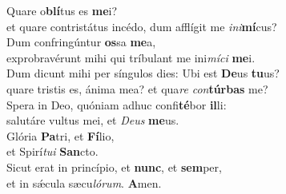 \oddverse Quare o\textbf{blí}tus es \textbf{me}i?~\*\\
\oddverse et quare contristátus incédo, dum afflígit me \textit{i}\textit{ni}\textbf{mí}cus?\\
\evenverse Dum confringúntur \textbf{os}sa \textbf{me}a,~\*\\
\evenverse exprobravérunt mihi qui tríbulant me ini\textit{mí}\textit{ci} \textbf{me}i.\\
\oddverse Dum dicunt mihi per síngulos dies: Ubi est \textbf{De}us \textbf{tu}us?~\*\\
\oddverse quare tristis es, ánima mea? et qua\textit{re} \textit{con}\textbf{túr}\textbf{bas} me?\\
\evenverse Spera in Deo, quóniam adhuc confi\textbf{té}bor \textbf{il}li:~\*\\
\evenverse salutáre vultus mei, et \textit{De}\textit{us} \textbf{me}us.\\
\oddverse Glória \textbf{Pa}tri, et \textbf{Fí}lio,~\*\\
\oddverse et Spirí\textit{tu}\textit{i} \textbf{San}cto.\\
\evenverse Sicut erat in princípio, et \textbf{nunc}, et \textbf{sem}per,~\*\\
\evenverse et in sǽcula sæcu\textit{ló}\textit{rum}. \textbf{A}men.\\
